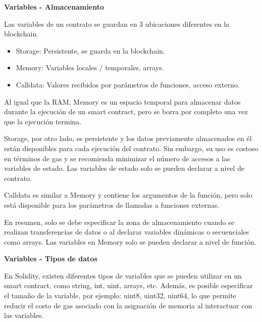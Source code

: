 \bigskip

\textbf{Variables - Almacenamiento}

\bigskip

Las variables de un contrato se guardan en 3 ubicaciones diferentes en la blockchain.

\begin{itemize}
    \item Storage: Persistente, se guarda en la blockchain.
    \item Memory: Variables locales / temporales, arrays.
    \item Calldata: Valores recibidos por parámetros de funciones, acceso externo.
\end{itemize}

Al igual que la RAM, Memory es un espacio temporal para almacenar datos durante la ejecución de un smart contract, pero se borra por completo una vez que la ejecución termina.

\bigskip

Storage, por otro lado, es persistente y los datos previamente almacenados en él están disponibles para cada ejecución del contrato. Sin embargo, su uso es costoso en términos de gas y se recomienda minimizar el número de accesos a las variables de estado. Las variables de estado solo se pueden declarar a nivel de contrato.

\bigskip

Calldata es similar a Memory y contiene los argumentos de la función, pero solo está disponible para los parámetros de llamadas a funciones externas.

\bigskip

En resumen, solo se debe especificar la zona de almacenamiento cuando se realizan transferencias de datos o al declarar variables dinámicas o secuenciales como arrays. Las variables en Memory solo se pueden declarar a nivel de función.

\bigskip



\newpage

\textbf{Variables - Tipos de datos}

\bigskip

En Solidity, existen diferentes tipos de variables que se pueden utilizar en un smart contract, como string, int, uint, arrays, etc. Además, es posible especificar el tamaño de la variable, por ejemplo: uint8, uint32, uint64, lo que permite reducir el costo de gas asociado con la asignación de memoria al interactuar con las variables.

